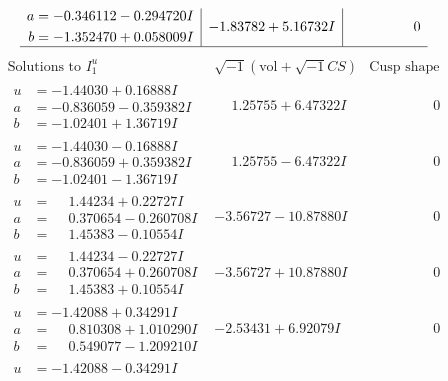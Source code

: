 \documentclass[1p]{elsarticle_modified}
\theoremstyle{definition}
\newcommand{\I}{\sqrt{-1}}
\begin{document}
$$\begin{array}{c|c|c}
\begin{aligned}
a &= -0.346112 - 0.294720 I \\
b &= -1.352470 + 0.058009 I\end{aligned}
 & -1.83782 + 5.16732 I & \phantom{-0.000000 } 0\\
 \hline 
 \end{array}$$\newpage$$\begin{array}{c|c|c}  
\text{Solutions to }I^u_{1}& \I (\text{vol} + \sqrt{-1}CS) & \text{Cusp shape}\\
 \hline 
\begin{aligned}
u &= -1.44030 + 0.16888 I \\
a &= -0.836059 - 0.359382 I \\
b &= -1.02401 + 1.36719 I\end{aligned}
 & \phantom{-}1.25755 + 6.47322 I & \phantom{-0.000000 } 0 \\ \hline\begin{aligned}
u &= -1.44030 - 0.16888 I \\
a &= -0.836059 + 0.359382 I \\
b &= -1.02401 - 1.36719 I\end{aligned}
 & \phantom{-}1.25755 - 6.47322 I & \phantom{-0.000000 } 0 \\ \hline\begin{aligned}
u &= \phantom{-}1.44234 + 0.22727 I \\
a &= \phantom{-}0.370654 - 0.260708 I \\
b &= \phantom{-}1.45383 - 0.10554 I\end{aligned}
 & -3.56727 - 10.87880 I & \phantom{-0.000000 } 0 \\ \hline\begin{aligned}
u &= \phantom{-}1.44234 - 0.22727 I \\
a &= \phantom{-}0.370654 + 0.260708 I \\
b &= \phantom{-}1.45383 + 0.10554 I\end{aligned}
 & -3.56727 + 10.87880 I & \phantom{-0.000000 } 0 \\ \hline\begin{aligned}
u &= -1.42088 + 0.34291 I \\
a &= \phantom{-}0.810308 + 1.010290 I \\
b &= \phantom{-}0.549077 - 1.209210 I\end{aligned}
 & -2.53431 + 6.92079 I & \phantom{-0.000000 } 0 \\ \hline\begin{aligned}
u &= -1.42088 - 0.34291 I \\

\end{aligned}
\end{array}$$
\end{document}
